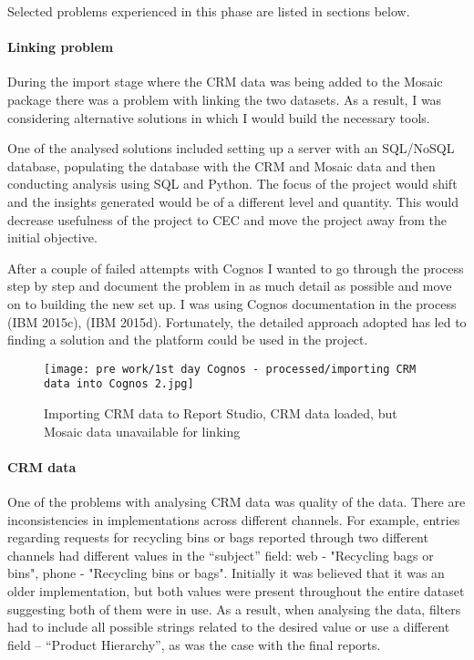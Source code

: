 Selected problems experienced in this phase are listed in sections below.			
			
				\paragraph{Linking problem}
				
During the import stage where the CRM data was being added to the Mosaic package there was a problem with linking the two datasets. As a result, I was considering alternative solutions in which I would build the necessary tools.

One of the analysed solutions included setting up a server with an SQL/NoSQL database, populating the database with the CRM and Mosaic data and then conducting analysis using SQL and Python. The focus of the project would shift and the insights generated would be of a different level and quantity. This would decrease usefulness of the project to CEC and move the project away from the initial objective.

After a couple of failed attempts with Cognos I wanted to go through the process step by step and document the problem in as much detail as possible and move on to building the new set up. I was using Cognos documentation in the process (IBM 2015c), (IBM 2015d). Fortunately, the detailed approach adopted has led to finding a solution and the platform could be used in the project.

\begin{figure}[hp]
\centering
     \texttt{[image: pre work/1st day Cognos - processed/importing CRM data into Cognos 2.jpg]}
      \caption{Importing CRM data to Report Studio, CRM data loaded, but Mosaic data unavailable for linking}
       \label{normal_case}
\end{figure}
				
				\paragraph{CRM data}
				
One of the problems with analysing CRM data was quality of the data. There are inconsistencies in implementations across different channels. For example, entries regarding requests for recycling bins or bags reported through two different channels had different values in the “subject” field: web - "Recycling bags or bins", phone - "Recycling bins or bags". Initially it was believed that it was an older implementation, but both values were present throughout the entire dataset suggesting both of them were in use. As a result, when analysing the data, filters had to include all possible strings related to the desired value or use a different field – “Product Hierarchy”, as was the case with the final reports.

